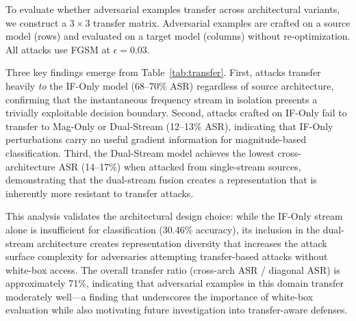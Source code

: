 \documentclass[conference]{IEEEtran}
\begin{document}
\label{sec:transferability}

To evaluate whether adversarial examples transfer across architectural variants, we construct a $3 \times 3$ transfer matrix. Adversarial examples are crafted on a source model (rows) and evaluated on a target model (columns) without re-optimization. All attacks use FGSM at $\epsilon = 0.03$.

\begin{table}[t]
\centering
\caption{Cross-Architecture Transfer ASR (\%) at $\epsilon=0.03$ (FGSM, 3-Seed Mean $\pm$ Std)}\label{tab:transfer}
\end{table}

Three key findings emerge from Table~\ref{tab:transfer}. First, attacks transfer heavily \textit{to} the IF-Only model (68--70\% ASR) regardless of source architecture, confirming that the instantaneous frequency stream in isolation presents a trivially exploitable decision boundary. Second, attacks crafted on IF-Only fail to transfer to Mag-Only or Dual-Stream (12--13\% ASR), indicating that IF-Only perturbations carry no useful gradient information for magnitude-based classification. Third, the Dual-Stream model achieves the lowest cross-architecture ASR (14--17\%) when attacked from single-stream sources, demonstrating that the dual-stream fusion creates a representation that is inherently more resistant to transfer attacks.

This analysis validates the architectural design choice: while the IF-Only stream alone is insufficient for classification (30.46\% accuracy), its inclusion in the dual-stream architecture creates representation diversity that increases the attack surface complexity for adversaries attempting transfer-based attacks without white-box access. The overall transfer ratio (cross-arch ASR / diagonal ASR) is approximately 71\%, indicating that adversarial examples in this domain transfer moderately well---a finding that underscores the importance of white-box evaluation while also motivating future investigation into transfer-aware defenses.
\end{document}
